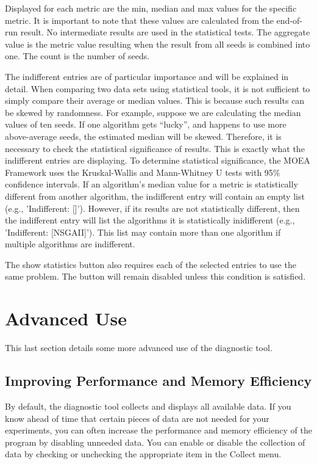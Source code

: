 Displayed for each metric are the min, median and max values for the specific metric.  It is important to note that these values are calculated from the end-of-run result.  No intermediate results are used in the statistical tests.  The aggregate value is the metric value resulting when the result from all seeds is combined into one.  The count is the number of seeds.  

The indifferent entries are of particular importance and will be explained in detail.  When comparing two data sets using statistical tools, it is not sufficient to simply compare their average or median values.  This is because such results can be skewed by randomness.  For example, suppose we are calculating the median values of ten seeds.  If one algorithm gets ``lucky'', and happens to use more above-average seeds, the estimated median will be skewed.  Therefore, it is necessary to check the statistical significance of results.  This is exactly what the indifferent entries are displaying.  To determine statistical significance, the MOEA Framework uses the Kruskal-Wallis and Mann-Whitney U tests with 95\% confidence intervals.  If an algorithm's median value for a metric is statistically different from another algorithm, the indifferent entry will contain an empty list (e.g., 'Indifferent: []').  However, if its results are not statistically different, then the indifferent entry will list the algorithms it is statistically inidifferent (e.g., 'Indifferent: [NSGAII]').  This list may contain more than one algorithm if multiple algorithms are indifferent.

\begin{important}
  The show statistics button also requires each of the selected entries to use the same problem.  The button will remain disabled unless this condition is satisfied.
\end{important}

\section{Advanced Use}
This last section details some more advanced use of the diagnostic tool.

\subsection{Improving Performance and Memory Efficiency}
By default, the diagnostic tool collects and displays all available data.  If you know ahead of time that certain pieces of data are not needed for your experiments, you can often increase the performance and memory efficiency of the program by disabling unneeded data.  You can enable or disable the collection of data by checking or unchecking the appropriate item in the Collect menu.